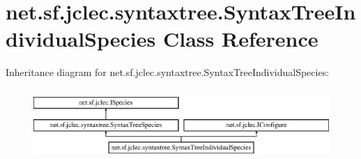 \hypertarget{classnet_1_1sf_1_1jclec_1_1syntaxtree_1_1_syntax_tree_individual_species}{\section{net.\-sf.\-jclec.\-syntaxtree.\-Syntax\-Tree\-Individual\-Species Class Reference}
\label{classnet_1_1sf_1_1jclec_1_1syntaxtree_1_1_syntax_tree_individual_species}
}
Inheritance diagram for net.\-sf.\-jclec.\-syntaxtree.\-Syntax\-Tree\-Individual\-Species\-:\begin{figure}[H]
\begin{center}
\leavevmode
\includegraphics[height=2.700965cm]{classnet_1_1sf_1_1jclec_1_1syntaxtree_1_1_syntax_tree_individual_species}
\end{center}
\end{figure}
